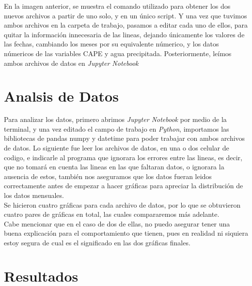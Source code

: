 \documentclass{article}
\begin{document}
En la imagen anterior, se muestra el comando utilizado para obtener los dos nuevos archivos a partir de uno solo, y en un único script. Y una vez que tuvimos ambos archivos en la carpeta de trabajo, pasamos a editar cada uno de ellos, para quitar la información innecesaria de las lineas, dejando únicamente los valores de las fechas, cambiando los meses por su equivalente númerico, y los datos númericos de las variables CAPE y agua precipitada. 
Posteriormente, leímos ambos archivos de datos en \textit{Jupyter Notebook}

\section{Analsis de Datos}
Para analizar los datos, primero abrimos \textit{Jupyter Notebook} por medio de la terminal, y una vez editado el campo de trabajo en \textit{Python}, importamos las bibliotecas de pandas numpy y datetime para poder trabajar con ambos archivos de datos. Lo siguiente fue leer los archivos de datos, en una o dos celular de codigo, e indicarle al programa que ignorara los errores entre las lineas, es decir, que no tomará en cuenta las lineas en las que faltaran datos, o ignorara la ausencia de estos, también nos aseguramos que los datos fueran leidos correctamente antes de empezar a hacer gráficas para apreciar la distribución de los datos mensuales. \\
Se hicieron cuatro gráficas para cada archivo de datos, por lo que se obtuvieron cuatro pares de gráficas en total, las cuales compararemos más adelante. \\
Cabe mencionar que en el caso de dos de ellas, no puedo asegurar tener una buena explicación para el comportamiento que tienen, pues en realidad ni siquiera estoy segura de cual es el significado en las dos gráficas finales. \\

\section{Resultados} 
\end{document}
